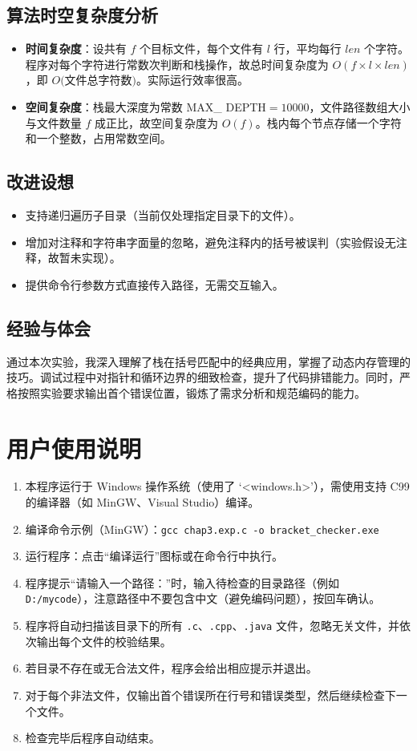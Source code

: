 \documentclass[UTF8]{ctexart}
\begin{document}
\subsection{算法时空复杂度分析}
\begin{itemize}
    \item \textbf{时间复杂度}：设共有 \( f \) 个目标文件，每个文件有 \( l \) 行，平均每行 \( len \) 个字符。程序对每个字符进行常数次判断和栈操作，故总时间复杂度为 \( O(f \times l \times len) \)，即 $ O($文件总字符数$) $。实际运行效率很高。
    \item \textbf{空间复杂度}：栈最大深度为常数 MAX\_ DEPTH$=10000 $，文件路径数组大小与文件数量 \( f \) 成正比，故空间复杂度为 \( O(f) \)。栈内每个节点存储一个字符和一个整数，占用常数空间。
\end{itemize}

\subsection{改进设想}
\begin{itemize}
    \item 支持递归遍历子目录（当前仅处理指定目录下的文件）。
    \item 增加对注释和字符串字面量的忽略，避免注释内的括号被误判（实验假设无注释，故暂未实现）。
    \item 提供命令行参数方式直接传入路径，无需交互输入。
\end{itemize}

\subsection{经验与体会}
通过本次实验，我深入理解了栈在括号匹配中的经典应用，掌握了动态内存管理的技巧。调试过程中对指针和循环边界的细致检查，提升了代码排错能力。同时，严格按照实验要求输出首个错误位置，锻炼了需求分析和规范编码的能力。

\section{用户使用说明}
\begin{enumerate}
    \item 本程序运行于 Windows 操作系统（使用了 ‘<windows.h>’），需使用支持 C99 的编译器（如 MinGW、Visual Studio）编译。
    \item 编译命令示例（MinGW）：\texttt{gcc chap3.exp.c -o bracket\_checker.exe}
    \item 运行程序：点击“编译运行”图标或在命令行中执行。
    \item 程序提示“请输入一个路径：”时，输入待检查的目录路径（例如 \texttt{D:/mycode}），注意路径中不要包含中文（避免编码问题），按回车确认。
    \item 程序将自动扫描该目录下的所有 \texttt{.c}、\texttt{.cpp}、\texttt{.java} 文件，忽略无关文件，并依次输出每个文件的校验结果。
    \item 若目录不存在或无合法文件，程序会给出相应提示并退出。
    \item 对于每个非法文件，仅输出首个错误所在行号和错误类型，然后继续检查下一个文件。
    \item 检查完毕后程序自动结束。
\end{enumerate}
\end{document}
